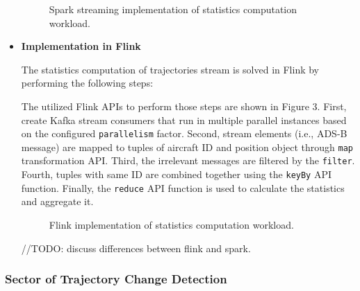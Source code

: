 \documentclass[]{article}
\begin{document}
\begin{itemize}
\begin{figure}[h]
 
  \centering
  
     \caption{Spark streaming implementation of statistics computation workload.}
\end{figure} 

\item {\bf{Implementation in Flink }}

The statistics computation of trajectories stream is solved in Flink by performing the following steps: 

\par The utilized Flink APIs to perform those steps are shown in Figure 3. First, create Kafka stream consumers that run in multiple parallel instances based on the configured \texttt{parallelism} factor. Second,  stream elements (i.e., ADS-B message) are mapped  to tuples of aircraft ID and  position object through \texttt{map} transformation API. Third, the irrelevant messages are filtered by the \texttt{filter}. Fourth, tuples with same ID are combined together using the \texttt{keyBy} API function. Finally, the \texttt{reduce} API function is used to calculate the statistics and aggregate it.

\begin{figure}[h]
 
  \centering
  
     \caption{Flink implementation of statistics computation workload.}
\end{figure}


//TODO: discuss differences between flink and spark.

\end{itemize}

\subsubsection{Sector of Trajectory Change Detection}
\end{document}
